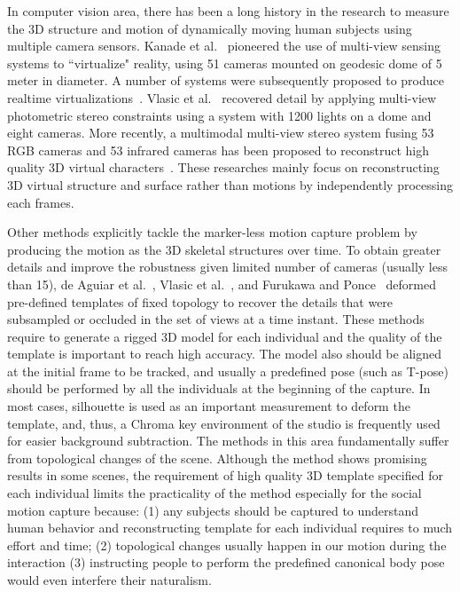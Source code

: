 In computer vision area, there has been a long history in the research to measure the 3D structure and motion of dynamically moving human subjects using multiple camera sensors. Kanade et al.~\cite{Kanade-1997} pioneered the use of multi-view sensing systems to ``virtualize" reality, using 51 cameras mounted on geodesic dome of 5 meter in diameter. A number of systems were subsequently proposed to produce realtime virtualizations~\cite{Matusik-2000,Matsuyama-2002,Gross-2003,Petit-2009}. Vlasic et al.~\cite{Vlasic-2009} recovered detail by applying multi-view photometric stereo constraints using a system with 1200 lights on a dome and eight cameras. More recently, a multimodal multi-view stereo system fusing 53 RGB cameras and 53 infrared cameras has been proposed to reconstruct high quality 3D virtual characters~\cite{Collet-15}. These researches mainly focus on reconstructing 3D virtual structure and surface rather than motions by independently processing each frames.

Other methods explicitly tackle the marker-less motion capture problem by producing the motion as the 3D skeletal structures over time. To obtain greater details and improve the robustness given limited number of cameras (usually less than 15), de Aguiar et al.~\cite{de2008performance}, Vlasic et al.~\cite{Vlasic-08}, and Furukawa and Ponce~\cite{Furukawa-2008} deformed pre-defined templates of fixed topology to recover the details that were subsampled or occluded in the set of views at a time instant. These methods require to generate a rigged 3D model for each individual and the quality of the template is important to reach high accuracy. The model also should be aligned at the initial frame to be tracked, and usually a predefined pose (such as T-pose) should be performed by all the individuals at the beginning of the capture. In most cases, silhouette is used as an important measurement to deform the template, and, thus, a Chroma key environment of the studio is frequently used for easier background subtraction. The methods in this area fundamentally suffer from topological changes of the scene. Although the method shows promising results in some scenes, the requirement of high quality 3D template specified for each individual limits the practicality of the method especially for the social motion capture because: (1) any subjects should be captured to understand human behavior and reconstructing template for each individual requires to much effort and time; (2) topological changes usually happen in our motion during the interaction (3) instructing people to perform the predefined canonical body pose would even interfere their naturalism. 


